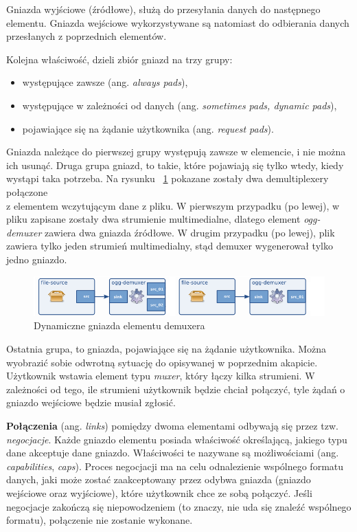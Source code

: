 \documentclass[12pt]{article}
\begin{document}
Gniazda wyjściowe (źródłowe), służą do przesyłania danych do następnego elementu. Gniazda wejściowe wykorzystywane są natomiast do odbierania danych przesłanych z poprzednich elementów.

Kolejna właściwość, dzieli zbiór gniazd na trzy grupy:
\begin{itemize}
 \setlength{\itemsep}{0em}
  \item występujące zawsze (ang. \textit{always pads}),
  \item występujące w zależności od danych (ang. \textit{sometimes pads, dynamic pads}),
  \item pojawiające się na żądanie użytkownika (ang. \textit{request pads}).
\end{itemize}

Gniazda należące do pierwszej grupy występują zawsze w elemencie, i nie można ich usunąć.
Druga grupa gniazd, to takie, które pojawiają się tylko wtedy, kiedy wystąpi taka potrzeba. Na rysunku ~\ref{fig:requestPadsDemux} pokazane zostały dwa demultiplexery połączone \\z elementem wczytującym dane z pliku. W pierwszym przypadku (po lewej), w pliku zapisane zostały dwa strumienie multimedialne, dlatego element \textit{ogg-demuxer} zawiera dwa gniazda źródłowe. W drugim przypadku (po lewej), plik zawiera tylko jeden strumień multimedialny, stąd demuxer wygenerował tylko jedno gniazdo.
\begin{figure}[H]
  \includegraphics[width=150mm]{img/request-pads-demux.png}
  \caption{Dynamiczne gniazda elementu demuxera \cite{gstmainpage}}
  \label{fig:requestPadsDemux}
\end{figure}
Ostatnia grupa, to gniazda, pojawiające się na żądanie użytkownika. Można wyobrazić sobie odwrotną sytuację do opisywanej w poprzednim akapicie. Użytkownik wstawia element typu \textit{muxer}, który łączy kilka strumieni. W zależności od tego, ile strumieni użytkownik będzie chciał połączyć, tyle żądań o gniazdo wejściowe będzie musiał zgłosić.

\textbf{Połączenia} (ang. \textit{links}) pomiędzy dwoma elementami odbywają się przez tzw. \textit{negocjacje}. Każde gniazdo elementu posiada właściwość określającą, jakiego typu dane akceptuje dane gniazdo. Właściwości te nazywane są możliwościami (ang. \textit{capabilities}, \textit{caps}). Proces negocjacji ma na celu odnalezienie wspólnego formatu danych, jaki może zostać zaakceptowany przez odybwa gniazda (gniazdo wejściowe oraz wyjściowe), które użytkownik chce ze sobą połączyć. Jeśli negocjacje zakończą się niepowodzeniem (to znaczy, nie uda się znaleźć wspólnego formatu), połączenie nie zostanie wykonane.
\end{document}
